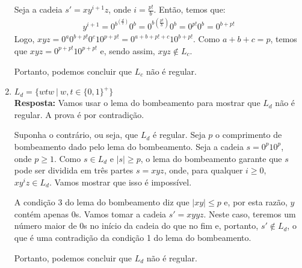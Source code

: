 \begin{enumerate}[label={\textbf{\alph*.}}]
    Seja a cadeia $s' = xy^{i+1}z$, onde $i = \frac{p!}{b}$. Então, temos que:
    \begin{align*}
        y^{i+1} = 0^{b^{(\frac{p!}{b})}} 0^b = 0^{b{(\frac{p!}{b})}} 0^b = 0^{p!}0^b = 0^{b + p!}
    \end{align*}
    Logo, $xyz = 0^a0^{b + p!}0^c10^{p + p!} = 0^{a + b + p! + c}10^{b + p!}$. Como $a + b + c = p$, temos que $xyz = 0^{p + p!}10^{p + p!}$ e, sendo assim, $xyz \notin L_c$.
    
    Portanto, podemos concluir que $L_c$ não é regular.
    
    \item $L_d = \{wtw \ |\ w, t \in \{0, 1\}^+\}$\\[3pt]
    \textbf{Resposta:} Vamos usar o lema do bombeamento para mostrar que $L_d$ não é regular. A prova é por contradição.
    
    Suponha o contrário, ou seja, que $L_d$ é regular. Seja $p$ o comprimento de bombeamento dado pelo lema do bombeamento. Seja a cadeia $s = 0^p10^p$, onde $p \geq 1$. Como $s \in L_d$ e $|s| \geq p$, o lema do bombeamento garante que $s$ pode ser dividida em três partes $s = xyz$, onde, para qualquer $i \geq 0$, $xy^iz \in L_d$. Vamos mostrar que isso é impossível.
    
    A condição 3 do lema do bombeamento diz que $|xy| \leq p$ e, por esta razão, $y$ contém apenas 0s. Vamos tomar a cadeia $s' = xyyz$. Neste caso, teremos um número maior de 0s no início da cadeia do que no fim e, portanto, $s' \notin L_d$, o que é uma contradição da condição 1 do lema do bombeamento.
    
    Portanto, podemos concluir que $L_d$ não é regular.
\end{enumerate}